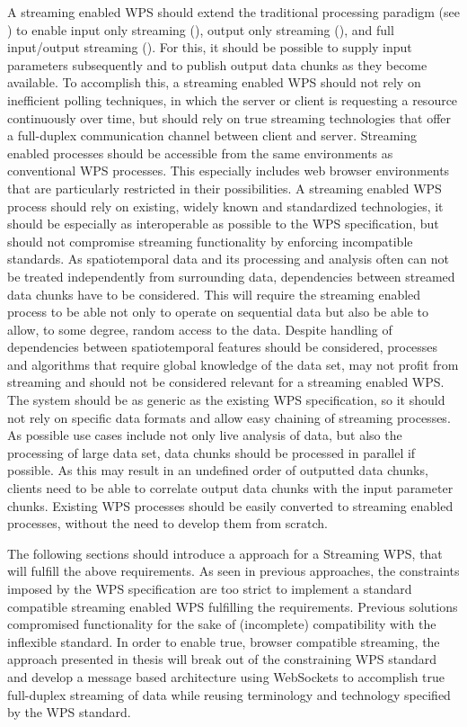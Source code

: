 A streaming enabled \ac{WPS} should extend the traditional processing paradigm (see ) to enable input only streaming (), output only streaming (), and full input/output streaming (). For this, it should be possible to supply input parameters subsequently and to publish output data chunks as they become available. To accomplish this, a streaming enabled \ac{WPS} should not rely on inefficient polling techniques, in which the server or client is requesting a resource continuously over time, but should rely on true streaming technologies that offer a full-duplex communication channel between client and server. Streaming enabled processes should be accessible from the same environments as conventional \ac{WPS} processes. This especially includes web browser environments that are particularly restricted in their possibilities. A streaming enabled \ac{WPS} process should rely on existing, widely known and standardized technologies, it should be especially as interoperable as possible to the \ac{WPS} specification, but should not compromise streaming functionality by enforcing incompatible standards. As spatiotemporal data and its processing and analysis often can not be treated independently from surrounding data, dependencies between streamed data chunks have to be considered. This will require the streaming enabled process to be able not only to operate on sequential data but also be able to allow, to some degree, random access to the data. Despite handling of dependencies between spatiotemporal features should be considered, processes and algorithms that require global knowledge of the data set, may not profit from streaming and should not be considered relevant for a streaming enabled \ac{WPS}. The system should be as generic as the existing \ac{WPS} specification, so it should not rely on specific data formats and allow easy chaining of streaming processes. As possible use cases include not only live analysis of data, but also the processing of large data set, data chunks should be processed in parallel if possible. As this may result in an undefined order of outputted data chunks, clients need to be able to correlate output data chunks with the input parameter chunks. Existing \ac{WPS} processes should be easily converted to streaming enabled processes, without the need to develop them from scratch.

The following sections should introduce a approach for a Streaming \ac{WPS}, that will fulfill the above requirements. As seen in previous approaches, the constraints imposed by the \ac{WPS} specification are too strict to implement a standard compatible streaming enabled WPS fulfilling the requirements. Previous solutions compromised functionality for the sake of (incomplete) compatibility with the inflexible standard. In order to enable true, browser compatible streaming, the approach presented in thesis will break out of the constraining \ac{WPS} standard and develop a message based architecture using WebSockets to accomplish true full-duplex streaming of data while reusing terminology and technology specified by the \ac{WPS} standard.

